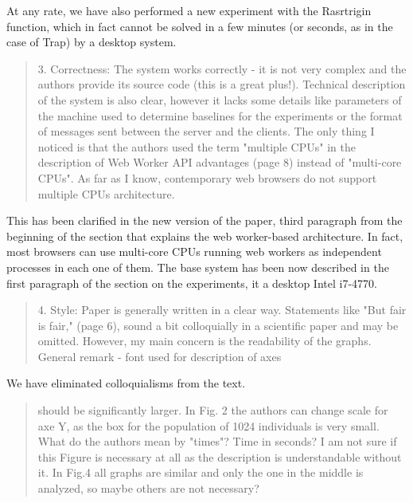 \documentclass[preprint]{elsarticle}
\begin{document}
At any rate, we have also performed a new experiment with the
Rasrtrigin function, which in fact cannot be solved in a few minutes
(or seconds, as in the case of Trap) by a desktop system. 



\begin{quote}
3. Correctness: The system works correctly - it is not very complex and the authors provide its source
code (this is a great plus!). Technical description of the system is also clear, however it lacks some
details like parameters of the machine used to determine baselines for the experiments or the format of
messages sent between the server and the clients. The only thing I noticed is that the authors used the
term "multiple CPUs" in the description of Web Worker API advantages (page 8) instead of "multi-core
CPUs". As far as I know, contemporary web browsers do not support
multiple CPUs architecture.
\end{quote}

This has been clarified in the new version of the paper, third
paragraph from the beginning of the section that explains the web
worker-based architecture. In fact, most browsers can use multi-core
CPUs running web workers as independent processes in each one of them.
The base system has been now described in the first paragraph of the
section on the experiments, it a desktop Intel i7-4770. 

\begin{quote}

4. Style: Paper is generally written in a clear way. Statements like
"But fair is fair," (page 6), sound a bit colloquially in a scientific
paper and may be omitted. However, my main concern is the readability
of the graphs. General remark - font used for description of axes

\end{quote}

We have eliminated colloquialisms from the text.

\begin{quote}
should be significantly larger. In Fig. 2 the authors can change scale
for axe Y, as the box for the population of 1024 individuals is very
small.  What do the authors mean by "times"? Time in seconds? I am not
sure if this Figure is necessary at all as the description is
understandable without it. In Fig.4 all graphs are similar and only
the one in the middle is analyzed, so maybe others are not necessary?
\end{quote}
\end{document}
